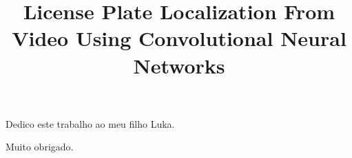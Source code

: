 \documentclass[oneside,a4paper,12pt]{normas-utf-tex}
\title{License Plate Localization From Video Using Convolutional Neural Networks}
\begin{document}
\setcounter{figure}{200}


\capa

\folhaderosto


\begin{dedicatoria}
	Dedico este trabalho ao meu filho Luka.
\end{dedicatoria}

\begin{agradecimentos}
	Muito obrigado.	
\end{agradecimentos}

\begin{resumo}
	
\end{resumo}

\begin{abstract}
	
\end{abstract}


\listadefiguras
\listadetabelas
\listadesiglas

\sumario






%
%

%
%
\end{document}
